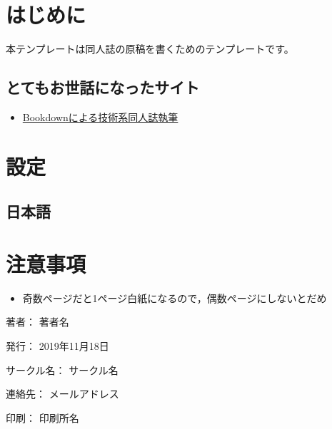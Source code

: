 \documentclass[xelatex,ja=standard, b5paper]{bxjsbook}
\title{}
\author{}
\date{}
\providecommand{\tightlist}{%
  \setlength{\itemsep}{0pt}\setlength{\parskip}{0pt}}
\begin{document}
{
\setcounter{tocdepth}{1}
\tableofcontents
}
\hypertarget{hajimeni}{%
\chapter*{はじめに}\label{hajimeni}}

本テンプレートは同人誌の原稿を書くためのテンプレートです。

\hypertarget{ux3068ux3066ux3082ux304aux4e16ux8a71ux306bux306aux3063ux305fux30b5ux30a4ux30c8}{%
\section{とてもお世話になったサイト}\label{ux3068ux3066ux3082ux304aux4e16ux8a71ux306bux306aux3063ux305fux30b5ux30a4ux30c8}}

\begin{itemize}
\tightlist
\item
  \href{https://teastat.blogspot.com/2019/01/bookdown.html}{Bookdownによる技術系同人誌執筆}
\end{itemize}

\hypertarget{setting}{%
\chapter{設定}\label{setting}}

\hypertarget{setting_japanese}{%
\section{日本語}\label{setting_japanese}}

\hypertarget{caution}{%
\chapter{注意事項}\label{caution}}

\begin{itemize}
\tightlist
\item
  奇数ページだと1ページ白紙になるので，偶数ページにしないとだめ
\end{itemize}

\clearpage
{}
\begin{flushright}
\begin{minipage}{0.5\hsize}
\begin{description}
  \item{著者：} 著者名
  \item{発行：} 2019年11月18日
  \item{サークル名：} サークル名
  \item{連絡先：} メールアドレス
  \item{印刷：} 印刷所名
\end{description}
\end{minipage}
\end{flushright}
\clearpage
\end{document}
